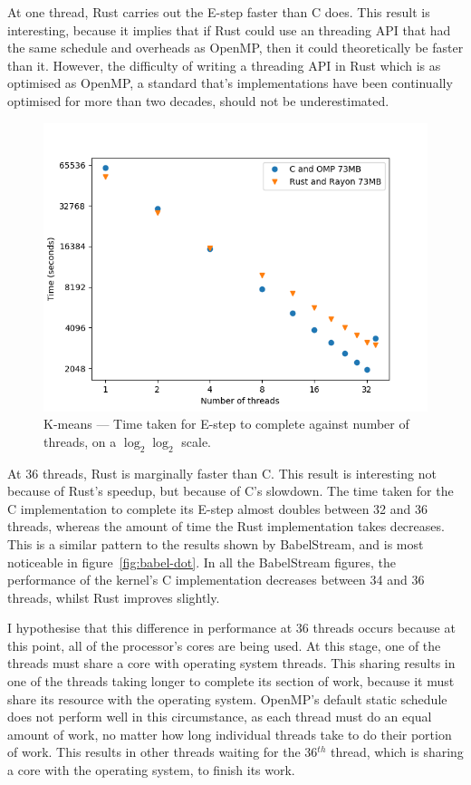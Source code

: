 At one thread, Rust carries out the E-step faster than C does. This result is interesting, because it implies that if Rust could use an threading API that had the same schedule and overheads as OpenMP, then it could theoretically be faster than it. However, the difficulty of writing a threading API in Rust which is as optimised as OpenMP, a standard that's implementations have been continually optimised for more than two decades, should not be underestimated.

\begin{figure}[h]
\centering
\includegraphics[width=.9\linewidth]{figs/kmeans/time.png}
\caption[K-means --- Time]{K-means --- Time taken for E-step to complete against number of threads, on a $\log_2 \log_2$ scale.}\label{fig:kmeans-time}
\end{figure}

At 36 threads, Rust is marginally faster than C. This result is interesting not because of Rust's speedup, but because of C's slowdown. The time taken for the C implementation to complete its E-step almost doubles between 32 and 36 threads, whereas the amount of time the Rust implementation takes decreases. This is a similar pattern to the results shown by BabelStream, and is most noticeable in figure~\ref{fig:babel-dot}.
In all the BabelStream figures, the performance of the kernel's C implementation decreases between 34 and 36 threads, whilst Rust improves slightly.

I hypothesise that this difference in performance at 36 threads occurs because at this point, all of the processor's cores are being used. At this stage, one of the threads must share a core with operating system threads. This sharing results in one of the threads taking longer to complete its section of work, because it must share its resource with the operating system. OpenMP's default static schedule does not perform well in this circumstance, as each thread must do an equal amount of work, no matter how long individual threads take to do their portion of work.
This results in other threads waiting for the 36$^{th}$ thread, which is sharing a core with the operating system, to finish its work.

